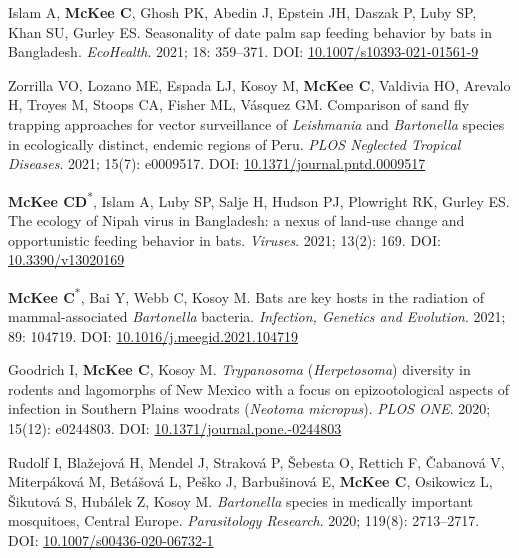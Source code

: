 \documentclass{cv}
\begin{document}
\begin{pubenum}
\item Islam A, \textbf{McKee C}, Ghosh PK, Abedin J, Epstein JH, Daszak P, Luby SP, Khan SU, Gurley ES. Seasonality of date palm sap feeding behavior by bats in Bangladesh. \textit{EcoHealth}. 2021; 18: 359--371. DOI: \href{https://doi.org/10.1007/s10393-021-01561-9}{10.1007/s10393-021-01561-9}

\item Zorrilla VO, Lozano ME, Espada LJ, Kosoy M, \textbf{McKee C}, Valdivia HO, Arevalo H, Troyes M, Stoops CA, Fisher ML, Vásquez GM. Comparison of sand fly trapping approaches for vector surveillance of \textit{Leishmania} and \textit{Bartonella} species in ecologically distinct, endemic regions of Peru. \textit{PLOS Neglected Tropical Diseases}. 2021; 15(7): e0009517. DOI: \href{https://doi.org/10.1371/journal.pntd.0009517}{10.1371/journal.pntd.0009517}

\item \textbf{McKee CD}\textsuperscript{*}, Islam A, Luby SP, Salje H, Hudson PJ, Plowright RK, Gurley ES. The ecology of Nipah virus in Bangladesh: a nexus of land-use change and opportunistic feeding behavior in bats. \textit{Viruses}. 2021; 13(2): 169. DOI: \href{https://doi.org/10.3390/v13020169}{10.3390/v13020169}

\item \textbf{McKee C}\textsuperscript{*}, Bai Y, Webb C, Kosoy M. Bats are key hosts in the radiation of mammal-associated \textit{Bartonella} bacteria. \textit{Infection, Genetics and Evolution}. 2021; 89: 104719. DOI: \href{https://doi.org/10.1016/j.meegid.2021.104719}{10.1016/j.meegid.2021.104719}

\item Goodrich I, \textbf{McKee C}, Kosoy M. \textit{Trypanosoma} (\textit{Herpetosoma}) diversity in rodents and lagomorphs of New Mexico with a focus on epizootological aspects of infection in Southern Plains woodrats (\textit{Neotoma micropus}). \textit{PLOS ONE}. 2020; 15(12): e0244803. DOI: \href{https://doi.org/10.1371/journal.pone.0244803}{10.1371/journal.pone.-0244803}

\item Rudolf I, Blažejová H, Mendel J, Straková P, Šebesta O, Rettich F, Čabanová V, Miterpáková M, Betášová L, Peško J, Barbušinová E, \textbf{McKee C}, Osikowicz L, Šikutová S, Hubálek Z, Kosoy M. \textit{Bartonella} species in medically important mosquitoes, Central Europe. \textit{Parasitology Research}. 2020; 119(8): 2713--2717. DOI: \href{https://doi.org/10.1007/s00436-020-06732-1}{10.1007/s00436-020-06732-1}


\end{pubenum}
\end{document}
